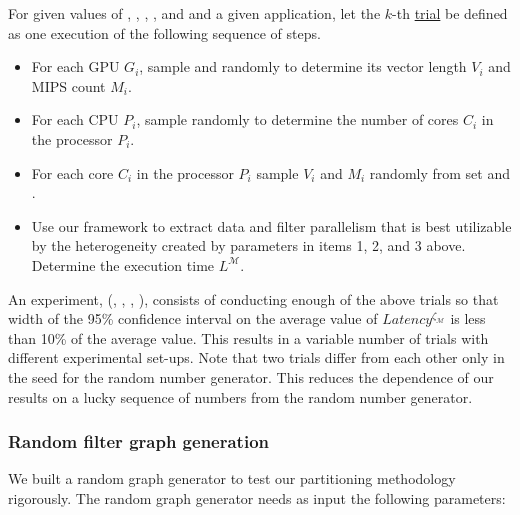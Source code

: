 For given values of \numtplgynodes, \gpunum, \veclenset, \corenumset,
and \mipsset and a given application, let the $k$-th \ul{trial} be
defined as one execution of the following sequence of steps.

\begin{itemize}

\item For each GPU $G_i$, sample \veclenset and \mipsset randomly to
  determine its vector length $V_i$ and MIPS count $M_i$. \label{i1}

\item For each CPU $P_i$, sample \corenumset randomly to determine the
  number of cores $C_i$ in the processor $P_i$.~\label{i2}

\item For each core $C_i$ in the processor $P_i$ sample $V_i$ and $M_i$
  randomly from set \veclenset and \mipsset.

\item Use our framework to extract data and filter parallelism that is
  best utilizable by the heterogeneity created by parameters in items 1,
  2, and 3 above. Determine the execution time
  $L^{\mathcal{M}}$.

\end{itemize}

An experiment, \expt(\numtplgynodes, \gpunum, \veclenset, \corenumset
\mipsset), consists of conducting enough of the above trials so that
width of the 95\% confidence interval on the average value of
$Latency^{\zeta_\mathcal{M}}$ is less than 10\% of the average
value. This results in a variable number of trials with different
experimental set-ups. Note that two trials differ from each other only
in the seed for the random number generator.  This reduces the
dependence of our results on a lucky sequence of numbers from the random
number generator.

\subsubsection{Random filter graph generation}
\label{sec:filter-graph-setup}

We built a random graph generator to test our partitioning methodology
rigorously. The random graph generator needs as input the following
parameters:


